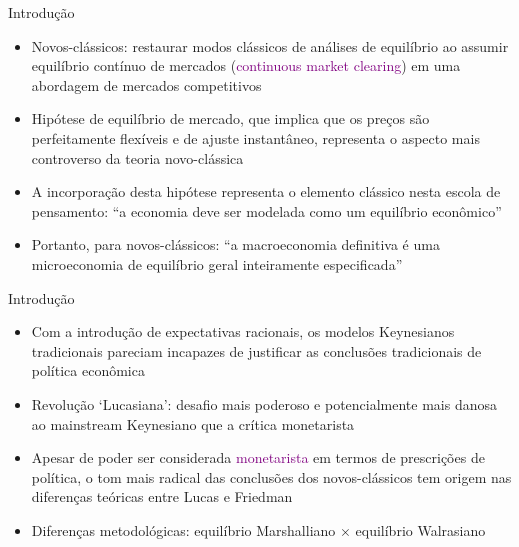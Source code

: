 \documentclass[10pt]{beamer}
\begin{document}
\begin{frame}{Introdução}
    \begin{itemize}
        \item Novos-clássicos: restaurar modos clássicos de análises de equilíbrio ao assumir equilíbrio contínuo de mercados (\textcolor{purple}{continuous market clearing}) em uma abordagem de mercados competitivos
        \bigskip
        \item Hipótese de equilíbrio de mercado, que implica que os preços são perfeitamente flexíveis e de ajuste instantâneo, representa o aspecto mais controverso da teoria novo-clássica
        \bigskip
        \item A incorporação desta hipótese representa o elemento clássico nesta escola de pensamento: ``a economia deve ser modelada como um equilíbrio econômico''
        \bigskip
        \item Portanto, para novos-clássicos: ``a macroeconomia definitiva é uma microeconomia de equilíbrio geral inteiramente especificada''
    \end{itemize}
\end{frame}

\begin{frame}{Introdução}
    \begin{itemize}
        \item Com a introdução de expectativas racionais, os modelos Keynesianos tradicionais pareciam incapazes de justificar as conclusões tradicionais de política econômica
        \bigskip
        \item Revolução `Lucasiana': desafio mais poderoso e potencialmente mais danosa ao mainstream Keynesiano que a crítica monetarista
        \bigskip
        \item Apesar de poder ser considerada \textcolor{purple}{monetarista} em termos de prescrições de política, o tom mais radical das conclusões dos novos-clássicos tem origem nas diferenças teóricas entre Lucas e Friedman
        \bigskip
        \item Diferenças metodológicas: equilíbrio Marshalliano $\times$ equilíbrio Walrasiano
    \end{itemize}
\end{frame}
\end{document}
